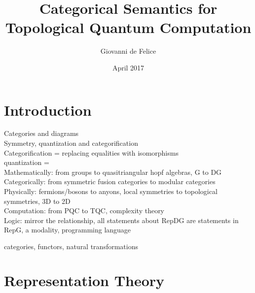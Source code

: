 \documentclass{article}
\title{Categorical Semantics for Topological Quantum Computation}
\author{Giovanni de Felice}
\date{April 2017}
\newenvironment{definition}[1][Definition]{\begin{trivlist}
\item[\hskip \labelsep {\bfseries #1}]}{\end{trivlist}}
\begin{document}
\maketitle
\tableofcontents

\pagebreak
\section{Introduction}
Categories and diagrams \\
Symmetry, quantization and categorification\\
Categorification = replacing equalities with isomorphisms\\
quantization =\\
Mathematically: from groups to quasitriangular hopf algebras, G to DG\\
Categorically: from symmetric fusion categories to modular categories\\
Physically: fermions/bosons to anyons, local symmetries to topological symmetries, 3D to 2D\\
Computation: from PQC to TQC, complexity theory\\
Logic: mirror the relationship, all statements about RepDG are statements in RepG, a modality, programming language
\begin{definition}
categories, functors, natural transformations
\end{definition}
\section{Representation Theory}
\end{document}
